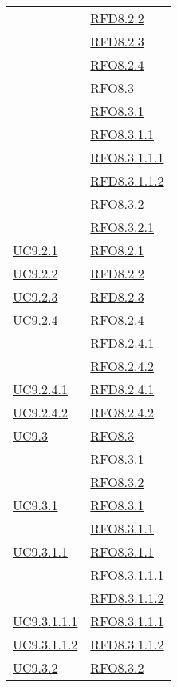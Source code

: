 \begin{longtable}{|>{\centering}m{5cm}|m{5cm}<{\centering}|}
& \hyperlink{RFD8.2.2}{RFD8.2.2}\\
& \hyperlink{RFD8.2.3}{RFD8.2.3}\\
& \hyperlink{RFO8.2.4}{RFO8.2.4}\\
& \hyperlink{RFO8.3}{RFO8.3}\\
& \hyperlink{RFO8.3.1}{RFO8.3.1}\\
& \hyperlink{RFO8.3.1.1}{RFO8.3.1.1}\\
& \hyperlink{RFO8.3.1.1.1}{RFO8.3.1.1.1}\\
& \hyperlink{RFD8.3.1.1.2}{RFD8.3.1.1.2}\\
& \hyperlink{RFO8.3.2}{RFO8.3.2}\\
& \hyperlink{RFO8.3.2.1}{RFO8.3.2.1}\\ \hline
\hyperref[UC9.2.1]{UC9.2.1} & \hyperlink{RFO8.2.1}{RFO8.2.1}\\ \hline
\hyperref[UC9.2.2]{UC9.2.2} & \hyperlink{RFD8.2.2}{RFD8.2.2}\\ \hline
\hyperref[UC9.2.3]{UC9.2.3} & \hyperlink{RFD8.2.3}{RFD8.2.3}\\ \hline
\hyperref[UC9.2.4]{UC9.2.4} & \hyperlink{RFO8.2.4}{RFO8.2.4}\\
& \hyperlink{RFD8.2.4.1}{RFD8.2.4.1}\\
& \hyperlink{RFO8.2.4.2}{RFO8.2.4.2}\\ \hline
\hyperref[UC9.2.4.1]{UC9.2.4.1} & \hyperlink{RFD8.2.4.1}{RFD8.2.4.1}\\ \hline
\hyperref[UC9.2.4.2]{UC9.2.4.2} & \hyperlink{RFO8.2.4.2}{RFO8.2.4.2}\\ \hline
\hyperref[UC9.3]{UC9.3} & \hyperlink{RFO8.3}{RFO8.3}\\
& \hyperlink{RFO8.3.1}{RFO8.3.1}\\
& \hyperlink{RFO8.3.2}{RFO8.3.2}\\ \hline
\hyperref[UC9.3.1]{UC9.3.1} & \hyperlink{RFO8.3.1}{RFO8.3.1}\\
& \hyperlink{RFO8.3.1.1}{RFO8.3.1.1}\\ \hline
\hyperref[UC9.3.1.1]{UC9.3.1.1} & \hyperlink{RFO8.3.1.1}{RFO8.3.1.1}\\
& \hyperlink{RFO8.3.1.1.1}{RFO8.3.1.1.1}\\
& \hyperlink{RFD8.3.1.1.2}{RFD8.3.1.1.2}\\ \hline
\hyperref[UC9.3.1.1.1]{UC9.3.1.1.1} & \hyperlink{RFO8.3.1.1.1}{RFO8.3.1.1.1}\\ \hline
\hyperref[UC9.3.1.1.2]{UC9.3.1.1.2} & \hyperlink{RFD8.3.1.1.2}{RFD8.3.1.1.2}\\ \hline
\hyperref[UC9.3.2]{UC9.3.2} & \hyperlink{RFO8.3.2}{RFO8.3.2}\\

\end{longtable}
